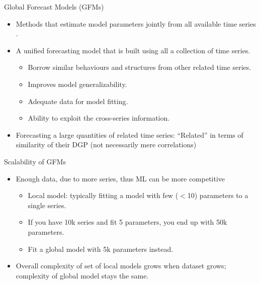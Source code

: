 \documentclass{beamer}
\begin{document}
   \begin{frame}{Global Forecast Models (GFMs)}
  	\begin{itemize}
  	\item Methods that estimate model parameters jointly from all available time series \cite{Januschowski2020-ud}.
	\vspace{2.0mm}
	\item A unified forecasting model that is built using all a collection of time series.
	\vspace{1.0mm}
	  \begin{itemize}\color{blue}
		\item Borrow similar behaviours and structures from other related time series.
		\item Improves model generalizability.
		\item Adequate data for model fitting.
		\item Ability to exploit the cross-series information.
	  \end{itemize}	   
	\vspace{2.0mm}	  
	  \item Forecasting a large quantities of related time series: ``Related'' in terms of similarity of their DGP (not necessarily mere correlations)~\cite{Bergmeir2020-nu}
 	\end{itemize}
   \end{frame} 
   
  
   \begin{frame}{Scalability of GFMs}
  	\begin{itemize}
  	\item Enough data, due to more series, thus ML can be more competitive~\cite{Bergmeir2020-nu}
	\vspace{2.0mm}
	  \begin{itemize}\color{blue}
		\item Local model: typically fitting a model with few ($<$10) parameters to a single series.
		\item If you have 10k series and fit 5 parameters, you end up with 50k parameters.
		\item Fit a global model with 5k parameters instead.
	  \end{itemize}	   
	\vspace{2.0mm}	  
	  \item Overall complexity of set of local models grows when dataset grows; complexity of global model stays the same.
 	\end{itemize}
   \end{frame}   
   
\end{document}
